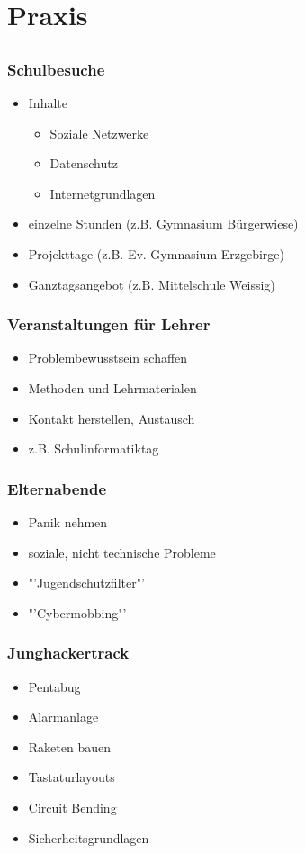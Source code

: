 \documentclass[12pt]{beamer}
\begin{document}
\section{Praxis}
\subsection{}

\begin{frame}
  \frametitle{Schulbesuche}
  \begin{itemize}
    \item<2-> Inhalte
    \begin{itemize}
      \item<3-> Soziale Netzwerke
      \item<4-> Datenschutz
      \item<5-> Internetgrundlagen
    \end{itemize}
    \item<6-> einzelne Stunden (z.B. Gymnasium Bürgerwiese)
    \item<7-> Projekttage (z.B. Ev. Gymnasium Erzgebirge)
    \item<8-> Ganztagsangebot (z.B. Mittelschule Weissig)
  \end{itemize}
\end{frame}

\begin{frame}
  \frametitle{Veranstaltungen für Lehrer}
  \begin{itemize}
    \item<2-> Problembewusstsein schaffen
    \item<3-> Methoden und Lehrmaterialen
    \item<4-> Kontakt herstellen, Austausch
    \item<5-> z.B. Schulinformatiktag
  \end{itemize}
\end{frame}

\begin{frame}
  \frametitle{Elternabende}
  \begin{itemize}
    \item<2-> Panik nehmen
    \item<3-> soziale, nicht technische Probleme
    \item<4-> "'Jugendschutzfilter"'
    \item<5-> "'Cybermobbing"'
  \end{itemize}
\end{frame}

\begin{frame}
  \frametitle{Junghackertrack}
  \begin{itemize}
    \item<2-> Pentabug
    \item<3-> Alarmanlage
    \item<4-> Raketen bauen
    \item<5-> Tastaturlayouts
    \item<6-> Circuit Bending
    \item<7-> Sicherheitsgrundlagen
  \end{itemize}
\end{frame}
\end{document}
